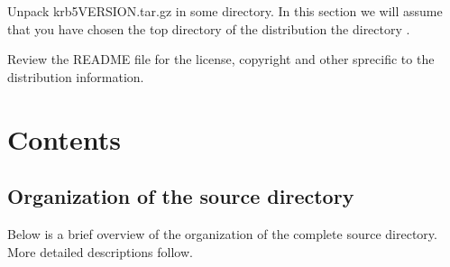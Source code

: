 \documentclass[letterpaper,10pt,english]{sphinxmanual}
\begin{document}
\begin{sphinxVerbatim}[commandchars=\\\{\}]
  
  
\end{sphinxVerbatim}

\sphinxAtStartPar
Unpack krb5\sphinxhyphen{}VERSION.tar.gz in some directory. In this section we will assume
that you have chosen the top directory of the distribution the directory
.

\sphinxAtStartPar
Review the README file for the license, copyright and other sprecific to the
distribution information.


\chapter{Contents}
\label{\detokenize{build/index:contents}}
\sphinxstepscope


\section{Organization of the source directory}
\label{\detokenize{build/directory_org:organization-of-the-source-directory}}\label{\detokenize{build/directory_org::doc}}
\sphinxAtStartPar
Below is a brief overview of the organization of the complete source
directory.  More detailed descriptions follow.
\end{document}
